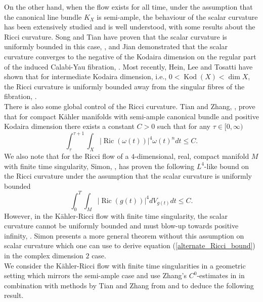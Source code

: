 \documentclass[12pt]{article}
\numberwithin{equation}{section}
\DeclareMathOperator{\Ric}{Ric}
\DeclareMathOperator{\Kod}{Kod}
\begin{document}
\indent On the other hand, when the flow exists for all time, under the assumption that the canonical line bundle $K_X$ is semi-ample, the behaviour of the scalar curvature has been extensively studied and is well understood, with some results about the Ricci curvature. Song and Tian have proven that the scalar curvature is uniformly bounded in this case, \cite{ST16}, and Jian demonstrated that the scalar curvature converges to the negative of the Kodaira dimension on the regular part of the induced Calabi-Yau fibration, \cite{J20}. Most recently, Hein, Lee and Tosatti have shown that for intermediate Kodaira dimension, i.e., $0 < \Kod(X) < \dim X$, the Ricci curvature is uniformly bounded away from the singular fibres of the fibration, \cite{HLT24}.\\
\indent There is also some global control of the Ricci curvature. Tian and Zhang, \cite{TZ15}, prove that for compact K\"ahler manifolds with semi-ample canonical bundle and positive Kodaira dimension there exists a constant $C > 0$ such that for any $\tau \in [0, \infty)$
\begin{equation*}
    \int_{\tau}^{\tau+1} \int_X |\Ric(\omega(t))|^4 \omega(t)^n dt \leq C.
\end{equation*}
We also note that for the Ricci flow of a $4$-dimensional, real, compact manifold $M$ with finite time singularity, Simon, \cite{S15}, has proven the following $L^4$-like bound on the Ricci curvature under the assumption that the scalar curvature is uniformly bounded
\begin{equation*}
    \int_0^T \int_M |\Ric(g(t))|^4 dV_{g(t)} dt \leq C.
\end{equation*}
However, in the K\"ahler-Ricci flow with finite time singularity, the scalar curvature cannot be uniformly bounded and must blow-up towards positive infinity, \cite{Z10}. Simon presents a more general theorem without this assumption on scalar curvature which one can use to derive equation (\ref{alternate_Ricci_bound}) in the complex dimension $2$ case.\\
\indent We consider the K\"ahler-Ricci flow with finite time singularities in a geometric setting which mirrors the semi-ample case and use Zhang's $C^0$-estimates in \cite{Z10} in combination with methods by Tian and Zhang from \cite{TZ15} and \cite{TZ16} to deduce the following result.
\end{document}
